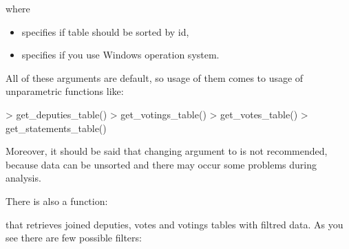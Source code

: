 where

\begin{itemize}
\item {} specifies if table should be sorted by id,
\item {} specifies if you use Windows operation system.
\end{itemize}

All of these arguments are default, so usage of them comes to usage of unparametric functions like:

\begin{example}
> get_deputies_table()
> get_votings_table()
> get_votes_table()
> get_statements_table()
\end{example}

Moreover, it should be said that changing  argument to  is not recommended, because data can be unsorted and there may occur some problems during analysis.

There is also a function:


that retrieves joined deputies, votes and votings tables
with filtred data. As you see there are few possible filters:

